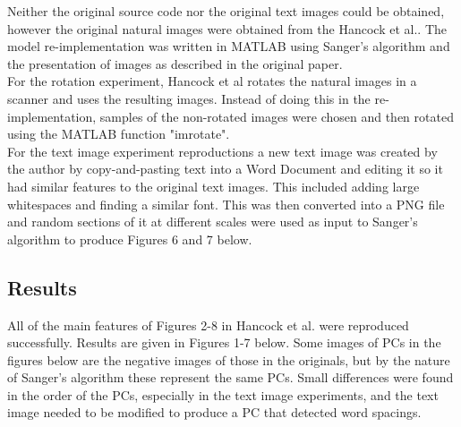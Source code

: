 Neither the original source code nor the original text images could be obtained, however the original natural images were obtained from the Hancock et al.. The model re-implementation was written in MATLAB using Sanger's algorithm and the presentation of images as described in the original paper.\\
For the rotation experiment, Hancock et al rotates the natural images in a scanner and uses the resulting images. Instead of doing this in the re-implementation, samples of the non-rotated images were chosen and then rotated using the MATLAB function "imrotate".\\
For the text image experiment reproductions a new text image was created by the author by copy-and-pasting text into a Word Document and editing it so it had similar features to the original text images. This included adding large whitespaces and finding a similar font. This was then converted into a PNG file and random sections of it at different scales were used as input to Sanger's algorithm to produce Figures 6 and 7 below. 

\subsection{Results}
All of the main features of Figures 2-8 in Hancock et al. were reproduced successfully. Results are given in Figures 1-7 below. Some images of PCs in the figures below are the negative images of those in the originals, but by the nature of Sanger's algorithm these represent the same PCs. Small differences were found in the order of the PCs, especially in the text image experiments, and the text image needed to be modified to produce a PC that detected word spacings.
 
